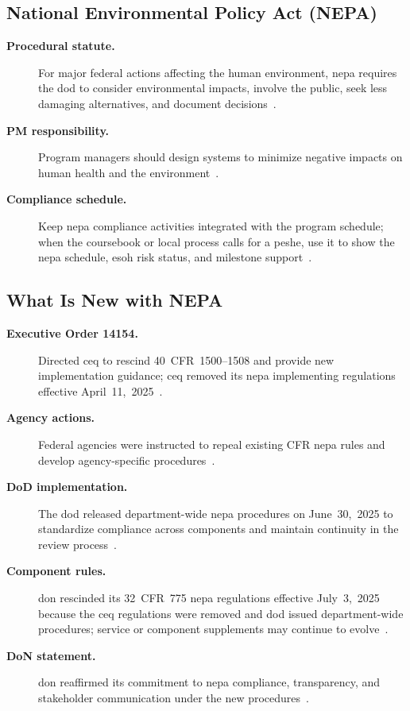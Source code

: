 \documentclass[../main.tex]{subfiles}
\begin{document}
\subsection{National Environmental Policy Act (NEPA)}
\begin{description}
  \item[\textbf{Procedural statute.}] For major federal actions affecting the human environment, \ac{nepa} requires the \ac{dod} to consider environmental impacts, involve the public, seek less damaging alternatives, and document decisions~\autocite{edo-3-3-7-environmental-requirements-2025}.
  \item[\textbf{PM responsibility.}] Program managers should design systems to minimize negative impacts on human health and the environment~\autocite{edo-3-3-7-environmental-requirements-2025}.
  \item[\textbf{Compliance schedule.}] Keep \ac{nepa} compliance activities integrated with the program schedule; when the coursebook or local process calls for a \ac{peshe}, use it to show the \ac{nepa} schedule, \ac{esoh} risk status, and milestone support~\autocite{DoDI5000-85,edo-3-3-7-environmental-requirements-2025}.
\end{description}

\subsection{What Is New with NEPA}
\begin{description}
  \item[\textbf{Executive Order 14154.}] Directed \ac{ceq} to rescind 40~CFR~1500--1508 and provide new implementation guidance; \ac{ceq} removed its \ac{nepa} implementing regulations effective April~11,~2025~\autocite{CEQ-NEPA-Regulations-Removal-2025,edo-3-3-7-environmental-requirements-2025}.
  \item[\textbf{Agency actions.}] Federal agencies were instructed to repeal existing CFR \ac{nepa} rules and develop agency-specific procedures~\autocite{edo-3-3-7-environmental-requirements-2025}.
  \item[\textbf{DoD implementation.}] The \ac{dod} released department-wide \ac{nepa} procedures on June~30,~2025 to standardize compliance across components and maintain continuity in the review process~\autocite{DoD-NEPA-Procedures-2025,edo-3-3-7-environmental-requirements-2025}.
  \item[\textbf{Component rules.}] \ac{don} rescinded its 32~CFR~775 \ac{nepa} regulations effective July~3,~2025 because the \ac{ceq} regulations were removed and \ac{dod} issued department-wide procedures; service or component supplements may continue to evolve~\autocite{DON-NEPA-Rescission-2025,DoD-NEPA-Procedures-2025}.
  \item[\textbf{DoN statement.}] \ac{don} reaffirmed its commitment to \ac{nepa} compliance, transparency, and stakeholder communication under the new procedures~\autocite{edo-3-3-7-environmental-requirements-2025}.
\end{description}
\end{document}
